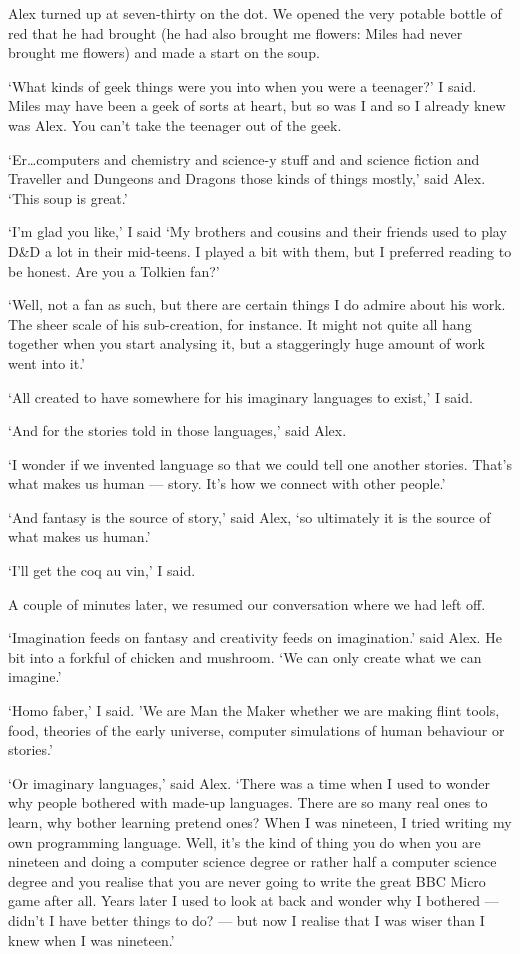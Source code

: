 Alex turned up at seven-thirty on the dot. We opened the very
potable bottle of red that he had brought (he had also brought me
flowers: Miles had never brought me flowers) and made a start on the
soup.

`What kinds of geek things were you into when you were a teenager?'
I said. Miles may have been a geek of sorts at heart, but so was I
and so I already knew was Alex. You can't take the teenager out of
the geek.

`Er\dots computers and chemistry and science-y stuff and and science fiction and {\twelvesl Traveller\/} and {\twelvesl Dungeons and Dragons\/} those kinds of things mostly,'
said Alex. `This soup is great.'

`I'm glad you like,' I said `My brothers and cousins and their
friends used to play {\twelvesl D{\&}D\/} a lot in their mid-teens.
I played a bit with them, but I preferred reading to be honest. Are
you a Tolkien fan?'

`Well, not a fan as such, but there are certain things I do admire
about his work. The sheer scale of his sub-creation, for instance.
It might not quite all hang together when you start analysing it,
but a staggeringly huge amount of work went into it.'

`All created to have somewhere for his imaginary languages to
exist,' I said.

`And for the stories told in those languages,' said Alex.

`I wonder if we invented language so that we could tell one another
stories. That's what makes us human --- story. It's how we connect
with other people.'

`And fantasy is the source of story,' said Alex, `so ultimately it
is the source of what makes us human.'

`I'll get the coq au vin,' I said.

A couple of minutes later, we resumed our conversation where we had
left off.

`Imagination feeds on fantasy and creativity feeds on imagination.'
said Alex. He bit into a forkful of chicken and mushroom. `We can
only create what we can imagine.'

`{\twelveit Homo faber},' I said. 'We are Man the Maker whether we
are making flint tools, food, theories of the early universe,
computer simulations of human behaviour or stories.'

`Or imaginary languages,' said Alex. `There was a time when I used to wonder why people
bothered with made-up languages. There are so many real ones to
learn, why bother learning pretend ones? When I was nineteen, I
tried writing my own programming language. Well, it's the kind of
thing you do when you are nineteen and doing a computer science
degree or rather half a computer science degree and you realise that
you are never going to write the great BBC Micro game after all.
Years later I used to look at back and wonder why I bothered ---
didn't I have better things to do? --- but now I realise that I was
wiser than I knew when I was nineteen.'

